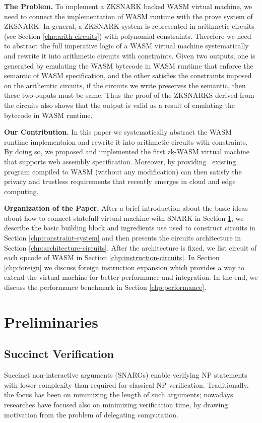 \smallskip\noindent\textbf{The Problem.}
To implement a ZKSNARK backed WASM virtual machine, we need to connect the implementation of WASM runtime with the prove system of ZKSNARK. In general, a ZKSNARK system is represented in arithmetic circuits (see Section \ref{chp:arith-circuits}) with polynomial constraints. Therefore we need to abstract the full imperative logic of a WASM virtual machine systematically and rewrite it into arithmetic circuits with constraints. Given two outputs, one is generated by emulating the WASM bytecode in WASM runtime that enforce the semantic of WASM specification, and the other satisfies the constraints imposed on the arithemtic circuits, if the circuits we write preserves the semantic, then these two ouputs must be same. Thus the proof of the ZKSNARKS derived from the circuits also shows that the output is valid as a result of emulating the bytecode in WASM runtime. 

\smallskip\noindent\textbf{Our Contribution.}
In this paper we systematically abstract the WASM runtime implementaion and rewrite it into arithmetic circuits with constraints. By doing so, we proposed and implemented the first zk-WASM virtual machine that supports web assembly specification. Moreover, by providing \zkwasm\, existing program compiled to WASM (without any modification) can then satisfy the privacy and trustless requirements that recently emerges in cloud and edge computing.

\smallskip\noindent\textbf{Organization of the Paper.}
After a brief introduction about the basic ideas about how to connect statefull virtual machine with SNARK in Section \ref{chp:preliminary}, we describe the basic building block and ingredients use used to construct \zkwasm circuits in Section \ref{chp:constraint-system} and then presents the circuits architecture in Section \ref{chp:architecture-circuits}. After the architecture is fixed, we list circuit of each opcode of WASM in Section \ref{chp:instruction-circuits}. In Section \ref{chp:foreign} we discuss foreign instruction expansion which provides a way to extend the virtual machine for better performance and integration. In the end, we discuss the performance benchmark in Section \ref{chp:performance}.

\section{Preliminaries}
\label{chp:preliminary}
\subsection{Succinct Verification}
Succinct non-interactive arguments (SNARGs) enable verifying NP statements with lower complexity than required for classical NP verification. Traditionally, the focus has been on minimizing the length of such arguments; nowadays researches have focused also on minimizing verification time, by drawing motivation from the problem of delegating computation.

